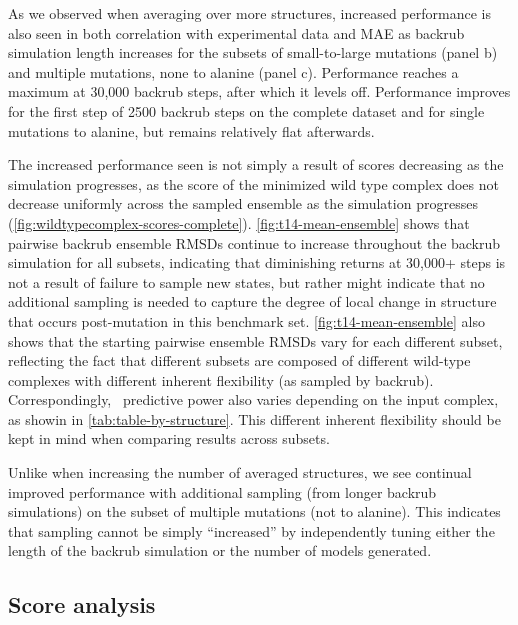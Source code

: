 As we observed when averaging over more structures, increased performance is also seen in both correlation with experimental data and MAE as backrub simulation length increases for the subsets of small-to-large mutations (panel b) and multiple mutations, none to alanine (panel c).
Performance reaches a maximum at 30,000 backrub steps, after which it levels off.
Performance improves for the first step of 2500 backrub steps on the complete dataset and for single mutations to alanine, but remains relatively flat afterwards.

The increased performance seen is not simply a result of scores decreasing as the simulation progresses, as the score of the minimized wild type complex does not decrease uniformly across the sampled ensemble as the simulation progresses (\cref{fig:wildtypecomplex-scores-complete}).
\cref{fig:t14-mean-ensemble} shows that pairwise backrub ensemble RMSDs continue to increase throughout the backrub simulation for all subsets, indicating that diminishing returns at 30,000+ steps is not a result of failure to sample new states, but rather might indicate that no additional sampling is needed to capture the degree of local change in structure that occurs post-mutation in this benchmark set.
\cref{fig:t14-mean-ensemble} also shows that the starting pairwise ensemble RMSDs vary for each different subset, reflecting the fact that different subsets are composed of different wild-type complexes with different inherent flexibility (as sampled by backrub).
Correspondingly, \ddg\ predictive power also varies depending on the input complex, as showin in \cref{tab:table-by-structure}.
This different inherent flexibility should be kept in mind when comparing results across subsets.

Unlike when increasing the number of averaged structures, we see continual improved performance with additional sampling (from longer backrub simulations) on the subset of multiple mutations (not to alanine).
This indicates that sampling cannot be simply ``increased'' by independently tuning either the length of the backrub simulation or the number of models generated. %

\subsection{Score analysis}

